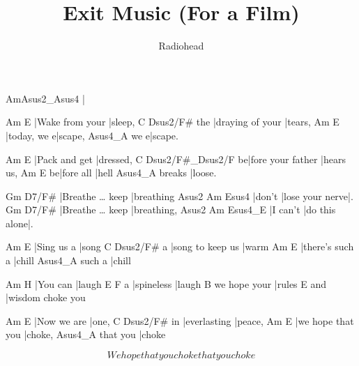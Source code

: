 \documentclass{song}
\author{Radiohead}
\title{Exit Music (For a Film)}
\begin{document}
\strophe
Am\quad{}Asus2_Asus4
|
\endstrophe

\begin{multicols}{2}

\strophe
Am              E
|Wake from your |sleep,
    C                Dsus2/F#
the |draying of your |tears,
Am          E
|today, we e|scape,
    Asus4_A
we e|scape.
\endstrophe

\strophe
Am            E
|Pack and get |dressed,
  C                 Dsus2/F#_Dsus2/F
be|fore your father |hears us,
  Am        E
be|fore all |hell
       Asus4_A
breaks |loose.
\endstrophe

\strophe
Gm                     D7/F#
|Breathe \ldots{} keep |breathing
Asus2  Am              Esus4
|don't |lose your nerve|.
Gm                     D7/F#
|Breathe \ldots{} keep |breathing,
Asus2    Am            Esus4_E
|I can't |do this alone|.
\endstrophe

\columnbreak

\strophe
Am         E
|Sing us a |song
  C                Dsus2/F#
a |song to keep us |warm
Am              E
|there's such a |chill
       Asus4_A
such a |chill
\endstrophe

\strophe
Am       H
|You can |laugh
  E          F
a |spineless |laugh
             B
we hope your |rules
    E
and |wisdom choke you
\endstrophe

\strophe
Am          E
|Now we are |one,
   C            Dsus2/F#
in |everlasting |peace,
Am                E
|we hope that you |choke,
         Asus4_A
that you |choke
\endstrophe

\strophe*
\[ We hope that you choke
that you choke \]
\endstrophe

\end{multicols}

\end{document}
